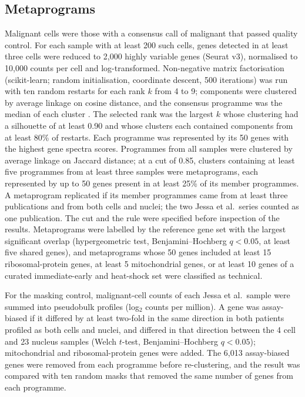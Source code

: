 \documentclass[11pt,a4paper]{article}
\begin{document}
\subsection{Metaprograms}
Malignant cells were those with a consensus call of malignant that passed quality control. For each sample with at least
200 such cells, genes detected in at least three cells were reduced to 2,000 highly variable genes (Seurat v3), normalised
to 10,000 counts per cell and log-transformed. Non-negative matrix factorisation (scikit-learn; random initialisation,
coordinate descent, 500 iterations) was run with ten random restarts for each rank $k$ from 4 to 9; components were
clustered by average linkage on cosine distance, and the consensus programme was the median of each cluster
\citep{kotliar2019identifying}. The selected rank was the largest $k$ whose clustering had a silhouette of at least 0.90 and
whose clusters each contained components from at least 80\% of restarts. Each programme was represented by its 50 genes
with the highest gene spectra scores. Programmes from all samples were clustered by average linkage on Jaccard distance;
at a cut of 0.85, clusters containing at least five programmes from at least three samples were metaprograms, each
represented by up to 50 genes present in at least 25\% of its member programmes. A metaprogram replicated if its member
programmes came from at least three publications and from both cells and nuclei; the two Jessa et al.\ series counted as
one publication. The cut and the rule were specified before inspection of the results. Metaprograms were labelled by the
reference gene set with the largest significant overlap (hypergeometric test, Benjamini--Hochberg $q < 0.05$, at least five
shared genes), and metaprograms whose 50 genes included at least 15 ribosomal-protein genes, at least 5 mitochondrial genes, or at
least 10 genes of a curated immediate-early and heat-shock set were classified as technical.

For the masking control, malignant-cell counts of each Jessa et al.\ sample were summed into pseudobulk profiles (log$_2$
counts per million). A gene was assay-biased if it differed by at least two-fold in the same direction in both patients
profiled as both cells and nuclei, and differed in that direction between the 4 cell and 23 nucleus samples (Welch $t$-test,
Benjamini--Hochberg $q < 0.05$); mitochondrial and ribosomal-protein genes were added. The 6,013 assay-biased genes were
removed from each programme before re-clustering, and the result was compared with ten random masks that removed the same
number of genes from each programme.
\end{document}
